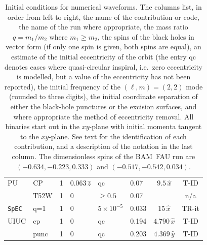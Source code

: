 \begin{table}
\begin{center}
\begin{tabular}{|l|l|l|l|l|l|c|c|}
PU\hfill\cite{Pretorius:2004jg,Pretorius:2005gq}  & CP \cite{Buonanno:2006ui}    & 1 & $0.063\,\hat z$      & qc  &
0.07  & $9.5\,\hat x$ & T-ID \cite{Cook:2004kt} \\
              & T52W \cite{Pretorius:2007jn}  & 1 & $0$       & $\ge
              0.5$ & 0.07 & & n/a \\[1em]

{\tt SpEC}\hfill  \cite{Scheel:2006gg}        & q=1 \cite{Boyle:2007ft,Scheel:2008rj}       & 1 & $0$       & $5\times 10^{-5}$  &
0.033 & $15\,\hat x$ & TR-it \cite{Pfeiffer:2007yz} \\[1em]

UIUC \hfill\cite{Etienne:2007hr}          & cp \cite{Etienne:2007hr}     & 1 & $0$       & qc  &
0.194 & $4.790\,\hat x$ & T-ID \cite{Cook:2004kt} \\ 
             & punc \cite{Etienne:2007hr}   & 1 & $0$     & qc  &
              0.203 & $4.369\,\hat y$ & T-ID \cite{Tichy:2003qi} \\  \hline
\end{tabular}
\end{center}
\caption[Initial conditions for numerical waveforms.]{
\label{tab:allwaveforms}
Initial conditions for numerical waveforms.
The columns list, in order from left
to right, the name of the contribution or code, the name of the run
where appropriate, 
the mass ratio $q=m_1/m_2$ where $m_1\ge m_2$, the
spins of the black holes in vector form (if only one spin is given, both spins are equal), an estimate of the initial
eccentricity of the orbit (the entry qc denotes cases where quasi-circular inspiral, i.e.~zero eccentricity
is modelled, but a value of the eccentricity has not been reported), the initial frequency of the $(\ell,m)=(2,2)$
mode (rounded to three digits), the initial coordinate separation
of either the black-hole punctures or the excision surfaces, and where
appropriate the method of eccentricity removal.  All binaries start
out in the $xy$-plane with initial momenta tangent to the $xy$-plane.  See text for the
identification of each contribution, and a description of the notation
in the last column. 
The dimensionless spins of the BAM~FAU run are $(-0.634,-0.223, 0.333)$ and 
$(-0.517,-0.542,0.034)$.}
\end{table}



